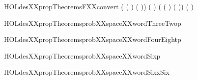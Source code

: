 \begin{SaveVerbatim}{HOLdesXXpropTheoremsFXXconvert}
     \HOLTokenLeftbrace{} \HOLTokenBar{}   \HOLSymConst{\HOLTokenEor{}}  ( \HOLSymConst{\HOLTokenEor{}} ( \HOLSymConst{\HOLTokenExtract{}} ) ( )) \HOLSymConst{=} ( \HOLSymConst{\HOLTokenExtract{}} ) \HOLTokenRightbrace{} \HOLConst{\ensuremath{\times}}
     \HOLTokenLeftbrace{} \HOLTokenBar{}   \HOLSymConst{\HOLTokenEor{}}  ( \HOLSymConst{\HOLTokenEor{}} ( \HOLSymConst{\HOLTokenExtract{}} ) ( )) \HOLSymConst{=} ( \HOLSymConst{\HOLTokenExtract{}} ) \HOLTokenRightbrace{}
\end{SaveVerbatim}
\newcommand{\HOLdesXXpropTheoremsFXXconvert}{\UseVerbatim{HOLdesXXpropTheoremsFXXconvert}}
\begin{SaveVerbatim}{HOLdesXXpropTheoremsprobXXspaceXXwordThreeTwop}
\HOLTokenTurnstile{}  
\end{SaveVerbatim}
\newcommand{\HOLdesXXpropTheoremsprobXXspaceXXwordThreeTwop}{\UseVerbatim{HOLdesXXpropTheoremsprobXXspaceXXwordThreeTwop}}
\begin{SaveVerbatim}{HOLdesXXpropTheoremsprobXXspaceXXwordFourEightp}
\HOLTokenTurnstile{}  
\end{SaveVerbatim}
\newcommand{\HOLdesXXpropTheoremsprobXXspaceXXwordFourEightp}{\UseVerbatim{HOLdesXXpropTheoremsprobXXspaceXXwordFourEightp}}
\begin{SaveVerbatim}{HOLdesXXpropTheoremsprobXXspaceXXwordSixp}
\HOLTokenTurnstile{}  
\end{SaveVerbatim}
\newcommand{\HOLdesXXpropTheoremsprobXXspaceXXwordSixp}{\UseVerbatim{HOLdesXXpropTheoremsprobXXspaceXXwordSixp}}
\begin{SaveVerbatim}{HOLdesXXpropTheoremsprobXXspaceXXwordSixxSix}
\HOLTokenTurnstile{}  
\end{SaveVerbatim}
\newcommand{\HOLdesXXpropTheoremsprobXXspaceXXwordSixxSix}{\UseVerbatim{HOLdesXXpropTheoremsprobXXspaceXXwordSixxSix}}
